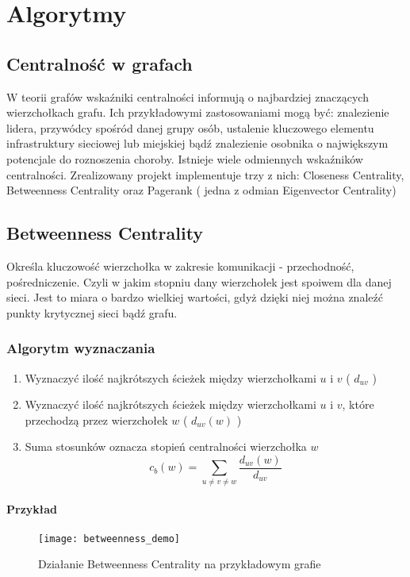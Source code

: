 \chapter{Algorytmy}

\section{Centralność w grafach}

W teorii grafów wskaźniki centralności informują o najbardziej znaczących wierzchołkach grafu. Ich przykładowymi zastosowaniami mogą być: znalezienie lidera, przywódcy spośród danej grupy osób, ustalenie kluczowego elementu infrastruktury sieciowej lub miejskiej bądź znalezienie osobnika o największym potencjale do roznoszenia choroby. Istnieje wiele odmiennych wskaźników centralności. Zrealizowany projekt implementuje trzy z nich: Closeness Centrality, Betweenness Centrality oraz Pagerank ( jedna z odmian Eigenvector Centrality)



\section{Betweenness Centrality}

Określa kluczowość wierzchołka w zakresie komunikacji - przechodność, pośredniczenie. Czyli w jakim stopniu dany wierzchołek jest spoiwem dla danej sieci. Jest to miara o bardzo wielkiej wartości, gdyż dzięki niej można znaleźć punkty krytycznej sieci bądź grafu.

\subsection{Algorytm wyznaczania}
\begin{enumerate}
\item Wyznaczyć ilość najkrótszych ścieżek między wierzchołkami $u$ i $v$ ( $d_{uv}$ )
\item Wyznaczyć ilość najkrótszych ścieżek między wierzchołkami $u$ i $v$, które przechodzą przez wierzchołek $w$ ( $d_{uv}(w)$ )
\item Suma stosunków  oznacza stopień centralności wierzchołka $w$ $$c_b(w) = \sum_{u \neq v \neq w} \frac{d_{uv}(w)}{d_{uv}}$$
\end{enumerate}

\FloatBarrier
\subsubsection{Przykład}
\begin{figure}[h]
\centering
\texttt{[image: betweenness\_demo]}
\caption{Działanie Betweenness Centrality  na przykładowym grafie}
\end{figure}
\FloatBarrier


